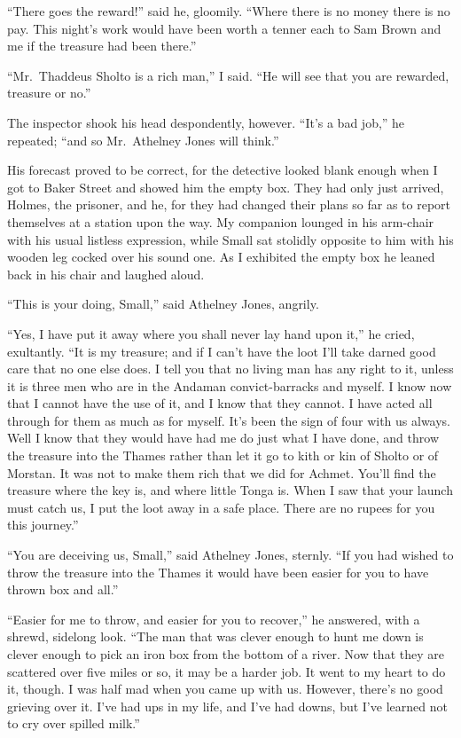 \documentclass[12pt,english,oneside]{book}
\begin{document}
{}``There goes the reward!'' said he, gloomily. {}``Where there
is no money there is no pay. This night's work would have been worth
a tenner each to Sam Brown and me if the treasure had been there.''

{}``Mr.\ Thaddeus Sholto is a rich man,'' I said. {}``He will
see that you are rewarded, treasure or no.''

The inspector shook his head despondently, however. {}``It's a bad
job,'' he repeated; {}``and so Mr.\ Athelney Jones will think.''

His forecast proved to be correct, for the detective looked blank
enough when I got to Baker Street and showed him the empty box. They
had only just arrived, Holmes, the prisoner, and he, for they had
changed their plans so far as to report themselves at a station upon
the way. My companion lounged in his arm-chair with his usual listless
expression, while Small sat stolidly opposite to him with his wooden
leg cocked over his sound one. As I exhibited the empty box he leaned
back in his chair and laughed aloud.

{}``This is your doing, Small,'' said Athelney Jones, angrily.

{}``Yes, I have put it away where you shall never lay hand upon it,''
he cried, exultantly. {}``It is my treasure; and if I can't have
the loot I'll take darned good care that no one else does. I tell
you that no living man has any right to it, unless it is three men
who are in the Andaman convict-barracks and myself. I know now that
I cannot have the use of it, and I know that they cannot. I have acted
all through for them as much as for myself. It's been the sign of
four with us always. Well I know that they would have had me do just
what I have done, and throw the treasure into the Thames rather than
let it go to kith or kin of Sholto or of Morstan. It was not to make
them rich that we did for Achmet. You'll find the treasure where the
key is, and where little Tonga is. When I saw that your launch must
catch us, I put the loot away in a safe place. There are no rupees
for you this journey.''

{}``You are deceiving us, Small,'' said Athelney Jones, sternly.
{}``If you had wished to throw the treasure into the Thames it would
have been easier for you to have thrown box and all.''

{}``Easier for me to throw, and easier for you to recover,'' he
answered, with a shrewd, sidelong look. {}``The man that was clever
enough to hunt me down is clever enough to pick an iron box from the
bottom of a river. Now that they are scattered over five miles or
so, it may be a harder job. It went to my heart to do it, though.
I was half mad when you came up with us. However, there's no good
grieving over it. I've had ups in my life, and I've had downs, but
I've learned not to cry over spilled milk.''
\end{document}

